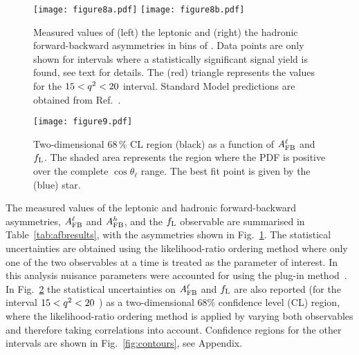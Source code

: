 \begin{figure}[ptb]
\centering
\texttt{[image: figure8a.pdf]}
\texttt{[image: figure8b.pdf]}
\caption{Measured values of (left) the leptonic and (right) the hadronic
  forward-backward asymmetries in bins of \qsq.
  Data points are only shown for \qsq intervals where a statistically
  significant signal yield is found, see text for details.
  The (red) triangle represents the values for the $15 < {q^2} < 20$ \gevgevcccc
  interval. Standard Model predictions are obtained from Ref.~\cite{Meinel:2014wua}.}
\label{fig:Afb_results}
\end{figure}

\begin{figure}[pbt]
\centering
\texttt{[image: figure9.pdf]}
\caption{Two-dimensional 68\,\% CL region (black) as a
  function of $A_{\rm FB}^\ell$ and $f_{\rm L}$.  The shaded area
  represents the region where the PDF is positive over the complete $\cos
  \theta_{\ell}$ range. The best fit point is given by the (blue) star. }
\label{fig:contour_highq2}
\end{figure}

The measured values of the leptonic and hadronic forward-backward
asymmetries, $A_{\rm FB}^\ell$ and $A_{\rm FB}^h$, and the $f_{\rm L}$
observable are summarised in Table~\ref{tab:afbresults}, with the
asymmetries shown in Fig.~\ref{fig:Afb_results}. The statistical
uncertainties are obtained using the likelihood-ratio ordering
method\cite{Feldman:1997qc} where only one of the two observables at a
time is treated as the parameter of interest.  In this analysis
nuisance parameters were accounted for using the plug-in
method~\cite{woodroofe}.  In Fig.~\ref{fig:contour_highq2} the
statistical uncertainties on $A_{\rm FB}^\ell$ and $f_{\rm L}$ are
also reported (for the interval $15 < {q^2} < 20$ \gevgevcccc) as a
two-dimensional 68\;\% confidence level (CL) region, where the
likelihood-ratio ordering method is applied by varying both
observables and therefore taking correlations into account.
Confidence regions for the other \qsq intervals are shown in
Fig.~\ref{fig:contours}, see Appendix.

